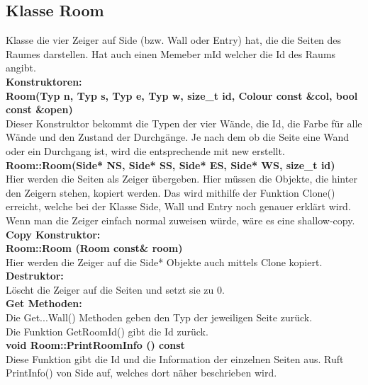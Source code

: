 \documentclass[12pt,a4paper]{article}
\begin{document}

\subsection {Klasse Room}
Klasse die vier Zeiger auf Side (bzw. Wall oder Entry) hat, die die Seiten des Raumes darstellen. Hat auch einen Memeber mId welcher die Id des Raums angibt.\\

\textbf {Konstruktoren:} \\ 
\textbf {Room(Typ n, Typ s, Typ e, Typ w, size\_t id, Colour const \&col, bool const \&open)} \\
Dieser Konstruktor bekommt die Typen der vier Wände, die Id, die Farbe für alle Wände und den Zustand der Durchgänge.
Je nach dem ob die Seite eine Wand oder ein Durchgang ist, wird die entsprechende mit new erstellt. \\

\textbf {Room::Room(Side* NS, Side* SS, Side* ES, Side* WS, size\_t id)} \\
Hier werden die Seiten als Zeiger übergeben. Hier müssen die Objekte, die hinter den Zeigern stehen, kopiert werden. Das wird mithilfe der Funktion Clone() erreicht, welche bei der Klasse Side, Wall und Entry noch genauer erklärt wird. Wenn man die Zeiger einfach normal zuweisen würde, wäre es eine shallow-copy. \\

\textbf {Copy Konstruktor:} \\
\textbf {Room::Room (Room const\& room)} \\
Hier werden die Zeiger auf die Side* Objekte auch mittels Clone kopiert. \\

\textbf {Destruktor:} \\
Löscht die Zeiger auf die Seiten und setzt sie zu 0.\\


\textbf {Get Methoden:} \\
Die Get...Wall() Methoden geben den Typ der jeweiligen Seite zurück. \\
Die Funktion GetRoomId() gibt die Id zurück. \\

\textbf {void Room::PrintRoomInfo () const} \\
Diese Funktion gibt die Id und die Information der einzelnen Seiten aus. Ruft PrintInfo() von Side auf, welches dort näher beschrieben wird. \\
\end{document}
